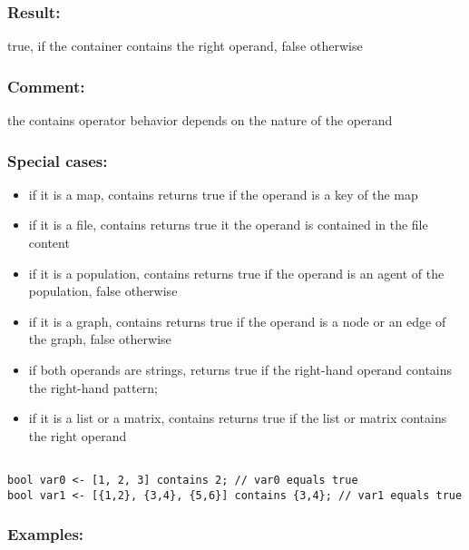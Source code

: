 \documentclass[]{book}
\providecommand{\tightlist}{%
  \setlength{\itemsep}{0pt}\setlength{\parskip}{0pt}}
\theoremstyle{definition}
\theoremstyle{definition}
\theoremstyle{definition}
\theoremstyle{remark}
\begin{document}
\subsubsection{Result:}\label{result-97}

true, if the container contains the right operand, false otherwise

\subsubsection{Comment:}\label{comment-24}

the contains operator behavior depends on the nature of the operand

\subsubsection{Special cases:}\label{special-cases-32}

\begin{itemize}
\tightlist
\item
  if it is a map, contains returns true if the operand is a key of the
  map\\
\item
  if it is a file, contains returns true it the operand is contained in
  the file content\\
\item
  if it is a population, contains returns true if the operand is an
  agent of the population, false otherwise\\
\item
  if it is a graph, contains returns true if the operand is a node or an
  edge of the graph, false otherwise\\
\item
  if both operands are strings, returns true if the right-hand operand
  contains the right-hand pattern;\\
\item
  if it is a list or a matrix, contains returns true if the list or
  matrix contains the right operand
\end{itemize}

\begin{verbatim}
 
bool var0 <- [1, 2, 3] contains 2; // var0 equals true 
bool var1 <- [{1,2}, {3,4}, {5,6}] contains {3,4}; // var1 equals true
\end{verbatim}

\subsubsection{Examples:}\label{examples-76}
\end{document}
